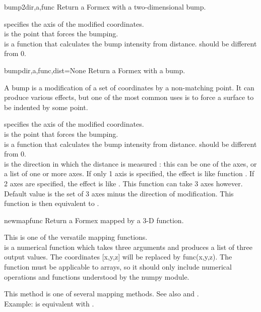 {{\begin{methoddesc}  {bump2}{dir,a,func}
Return a Formex with a two-dimensional bump.

 specifies the axis of the modified coordinates.\\
 is the point that forces the bumping.\\
 is a function that calculates the bump intensity from distance.  should be different from 0.
\end{methoddesc}

\begin{methoddesc}  {bump}{dir,a,func,dist=None}
Return a Formex with a bump.

A bump is a modification of a set of coordinates by a non-matching point. It can produce various effects, but one of the most common uses is to force a surface to be indented by some point.
        
 specifies the axis of the modified coordinates.\\
 is the point that forces the bumping.\\
 is a function that calculates the bump intensity from distance.  should be different from 0.\\
 is the direction in which the distance is measured : this can be one of the axes, or a list of one or more axes. If only 1 axis is specified, the effect is like function . If 2 axes are specified, the effect is like . This function can take 3 axes however. Default value is the set of 3 axes minus the direction of modification. This function is then equivalent to .
\end{methoddesc}

\begin{methoddesc}  {newmap}{func}
Return a Formex mapped by a 3-D function.

This is one of the versatile mapping functions.\\
 is a numerical function which takes three arguments and produces a list of three output values. The coordinates [x,y,z] will be replaced by func(x,y,z). The function must be applicable to arrays, so it should only include numerical operations and functions understood by the numpy module.

This method is one of several mapping methods. See also  and .\\
Example:  is equivalent with .
\end{methoddesc}

}}
